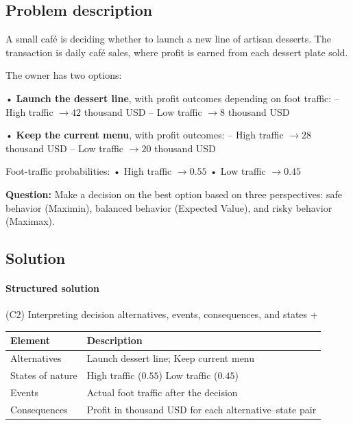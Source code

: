 \documentclass[11pt]{article}
\begin{document}
	
	\subsection*{Problem description}
	
	\hypertarget{problem1-problem}{}
	
	A small café is deciding whether to launch a new line of artisan desserts. The transaction is daily café sales, where
	profit is earned from each dessert plate sold.
	
	
	
	
	
	
	The owner has two options:
	
	
	
	
	
	
	• \textbf{Launch the dessert line}, with profit outcomes depending on foot traffic:
	– High traffic $\to 42$ thousand USD
	– Low traffic $\to 8$ thousand USD
	
	
	
	
	• \textbf{Keep the current menu}, with profit outcomes:
	– High traffic $\to 28$ thousand USD
	– Low traffic $\to 20$ thousand USD
	
	
	
	
	
	
	Foot-traffic probabilities:
	• High traffic $\to 0.55$
	• Low traffic $\to 0.45$
	
	
	
	
	
	\textbf{Question:} Make a decision on the best option based on three perspectives:
	safe behavior (Maximin), balanced behavior (Expected Value), and risky behavior (Maximax).
	
	\subsection*{Solution}
	
	\hypertarget{problem1-solution}{}
	
	\paragraph{Structured solution}
	
	
	(C2) Interpreting decision alternatives, events, consequences, and states
	+
	
	
	\begin{center}
		\begin{tabular}{ll}
			\toprule
			Element & Description \\
			\midrule
			Alternatives & Launch dessert line; Keep current menu \\
			States of nature & High traffic
			($0.55$)
			Low traffic
			($0.45$) \\
			Events & Actual foot traffic after the decision \\
			Consequences & Profit in thousand USD for each alternative–state pair \\
			\bottomrule
		\end{tabular}
	\end{center}
	
\end{document}
